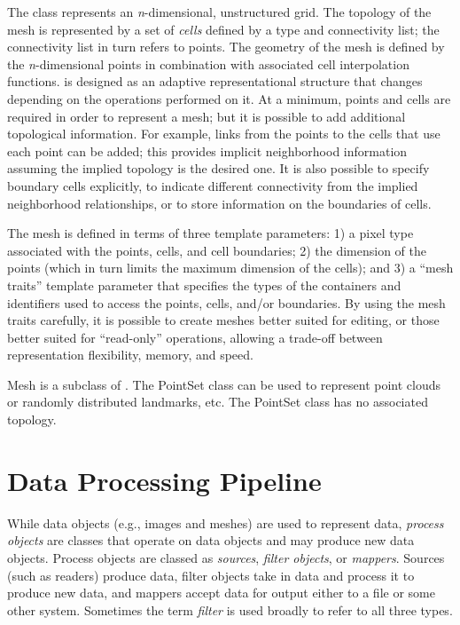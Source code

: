 
The  class represents an \emph{n}-dimensional, unstructured grid. The
topology of the mesh is represented by a set of \emph{cells} defined by a type
and connectivity list; the connectivity list in turn refers to points. The
geometry of the mesh is defined by the \emph{n}-dimensional points in
combination with associated cell interpolation functions.  is
designed as an adaptive representational structure that changes depending on
the operations performed on it. At a minimum, points and cells are required in
order to represent a mesh; but it is possible to add additional topological
information.  For example, links from the points to the cells that use each
point can be added; this provides implicit neighborhood information assuming
the implied topology is the desired one. It is also possible to specify
boundary cells explicitly, to indicate different connectivity from the implied
neighborhood relationships, or to store information on the boundaries of
cells.

The mesh is defined in terms of three template parameters: 1) a pixel type
associated with the points, cells, and cell boundaries; 2) the dimension of
the points (which in turn limits the maximum dimension of the cells); and 3)
a ``mesh traits'' template parameter that specifies the types of the
containers and identifiers used to access the points, cells, and/or
boundaries. By using the mesh traits carefully, it is possible to create
meshes better suited for editing, or those better suited for ``read-only''
operations, allowing a trade-off between representation flexibility, memory,
and speed.

Mesh is a subclass of . The PointSet
class can be used to represent point clouds or randomly distributed
landmarks, etc. The PointSet class has no associated topology.


\section{Data Processing Pipeline}
\label{sec:DataProcessingPipeline}



While data objects (e.g., images and meshes) are used to represent data,
\emph{process objects} are classes that operate on data objects and may
produce new data objects. Process objects are classed as
\emph{sources}, \emph{filter objects}, or \emph{mappers}.  Sources (such as
readers) produce data, filter objects take in data and process it to produce
new data, and mappers accept data for output either to a file or
some other system.  Sometimes the term \emph{filter} is used broadly
to refer to all three types.

